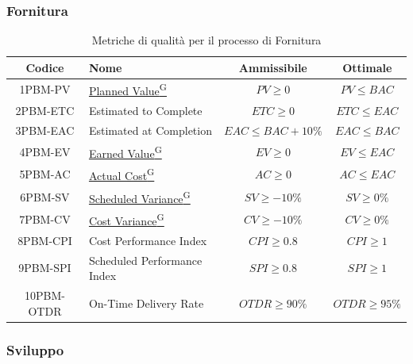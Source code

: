 \documentclass{article}
\begin{document}
\subsubsection{Fornitura} %
\begin{table}[H]
    \centering
    \renewcommand{\arraystretch}{1.5} %
    \begin{tabular}{|c|l|c|c|}
        \hline
        \textbf{Codice} & \textbf{Nome} & \textbf{Ammissibile} & \textbf{Ottimale} \\
        \hline
        1PBM-PV & \href{https://code7crusaders.github.io/docs/RTB/documentazione_interna/glossario.html#planned-value}{Planned Value\textsuperscript{G}} & $PV \geq 0$ & $PV \leq BAC$ \\
        2PBM-ETC & Estimated to Complete & $ETC \geq 0$ & $ETC \leq EAC$ \\
        3PBM-EAC & Estimated at Completion & $EAC \leq BAC + 10\%$ & $EAC \leq BAC$ \\
        4PBM-EV & \href{https://code7crusaders.github.io/docs/RTB/documentazione_interna/glossario.html#earned-value}{Earned Value\textsuperscript{G}} & $EV \geq 0$ & $EV \leq EAC$ \\
        5PBM-AC & \href{https://code7crusaders.github.io/docs/RTB/documentazione_interna/glossario.html#actual-cost}{Actual Cost\textsuperscript{G}} & $AC \geq 0$ & $AC \leq EAC$ \\
        6PBM-SV & \href{https://code7crusaders.github.io/docs/RTB/documentazione_interna/glossario.html#scheduled-variance}{Scheduled Variance\textsuperscript{G}} & $SV \geq -10\%$ & $SV \geq 0\%$ \\
        7PBM-CV & \href{https://code7crusaders.github.io/docs/RTB/documentazione_interna/glossario.html#cost-variance}{Cost Variance\textsuperscript{G}} & $CV \geq -10\%$ & $CV \geq 0\%$ \\
        8PBM-CPI & Cost Performance Index & $CPI \geq 0.8$ & $CPI \geq 1$ \\
        9PBM-SPI & Scheduled Performance Index & $SPI \geq 0.8$ & $SPI \geq 1$ \\
        10PBM-OTDR & On-Time Delivery Rate & $OTDR \geq 90\%$ & $OTDR \geq 95\%$ \\
        \hline
    \end{tabular}
    \label{tab:fornitura}
    \caption{Metriche di qualità per il processo di Fornitura}
\end{table}

\subsubsection{Sviluppo} %
\end{document}
